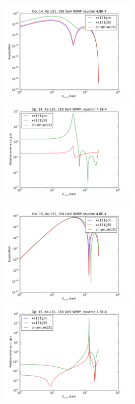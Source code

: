 \documentclass{article}
\begin{document}
\includegraphics[width=0.5\textwidth]{xe131-o14}
\includegraphics[width=0.5\textwidth]{xe131-o14-relerr}

\includegraphics[width=0.5\textwidth]{xe131-o15}
\includegraphics[width=0.5\textwidth]{xe131-o15-relerr}
\end{document}
